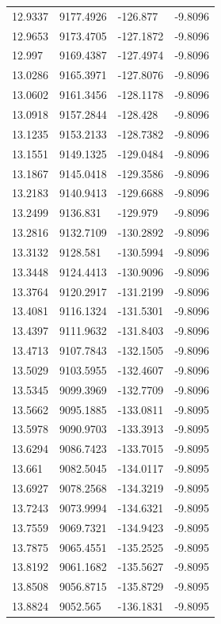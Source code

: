 \begin{table}[H]
\begin{tabular}{llll}
12.9337 & 9177.4926 & -126.877 & -9.8096 \\
12.9653 & 9173.4705 & -127.1872 & -9.8096 \\
12.997 & 9169.4387 & -127.4974 & -9.8096 \\
13.0286 & 9165.3971 & -127.8076 & -9.8096 \\
13.0602 & 9161.3456 & -128.1178 & -9.8096 \\
13.0918 & 9157.2844 & -128.428 & -9.8096 \\
13.1235 & 9153.2133 & -128.7382 & -9.8096 \\
13.1551 & 9149.1325 & -129.0484 & -9.8096 \\
13.1867 & 9145.0418 & -129.3586 & -9.8096 \\
13.2183 & 9140.9413 & -129.6688 & -9.8096 \\
13.2499 & 9136.831 & -129.979 & -9.8096 \\
13.2816 & 9132.7109 & -130.2892 & -9.8096 \\
13.3132 & 9128.581 & -130.5994 & -9.8096 \\
13.3448 & 9124.4413 & -130.9096 & -9.8096 \\
13.3764 & 9120.2917 & -131.2199 & -9.8096 \\
13.4081 & 9116.1324 & -131.5301 & -9.8096 \\
13.4397 & 9111.9632 & -131.8403 & -9.8096 \\
13.4713 & 9107.7843 & -132.1505 & -9.8096 \\
13.5029 & 9103.5955 & -132.4607 & -9.8096 \\
13.5345 & 9099.3969 & -132.7709 & -9.8096 \\
13.5662 & 9095.1885 & -133.0811 & -9.8095 \\
13.5978 & 9090.9703 & -133.3913 & -9.8095 \\
13.6294 & 9086.7423 & -133.7015 & -9.8095 \\
13.661 & 9082.5045 & -134.0117 & -9.8095 \\
13.6927 & 9078.2568 & -134.3219 & -9.8095 \\
13.7243 & 9073.9994 & -134.6321 & -9.8095 \\
13.7559 & 9069.7321 & -134.9423 & -9.8095 \\
13.7875 & 9065.4551 & -135.2525 & -9.8095 \\
13.8192 & 9061.1682 & -135.5627 & -9.8095 \\
13.8508 & 9056.8715 & -135.8729 & -9.8095 \\
13.8824 & 9052.565 & -136.1831 & -9.8095 \\

\end{tabular}
\end{table}
